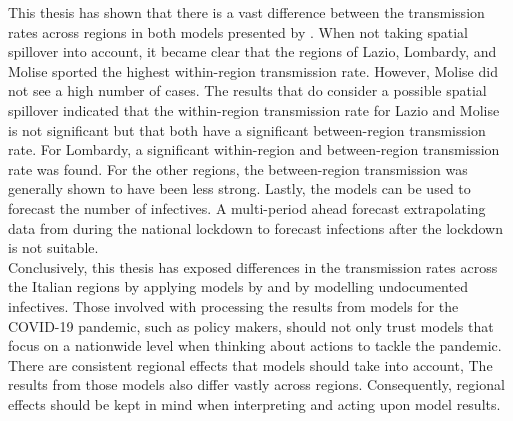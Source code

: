 \documentclass[12pt]{article}
\begin{document}
	This thesis has shown that there is a vast difference between the transmission rates across regions in both models presented by \textcite{adda2016economic}. When not taking spatial spillover into account, it became clear that the regions of Lazio, Lombardy, and Molise sported the highest within-region transmission rate. However, Molise did not see a high number of cases. The results that do consider a possible spatial spillover indicated that the within-region transmission rate for Lazio and Molise is not significant but that both have a significant between-region transmission rate. For Lombardy, a significant within-region and between-region transmission rate was found. For the other regions, the between-region transmission was generally shown to have been less strong. Lastly, the models can be used to forecast the number of infectives. A multi-period ahead forecast extrapolating data from during the national lockdown to forecast infections after the lockdown is not suitable.
	\\
	
	Conclusively, this thesis has exposed differences in the transmission rates across the Italian regions by applying models by \textcite{adda2016economic} and by modelling undocumented infectives. Those involved with processing the results from models for the COVID-19 pandemic, such as policy makers, should not only trust models that focus on a nationwide level when thinking about actions to tackle the pandemic. There are consistent regional effects that models should take into account, The results from those models also differ vastly across regions. Consequently, regional effects should be kept in mind when interpreting and acting upon model results.
	
	
\end{document}
